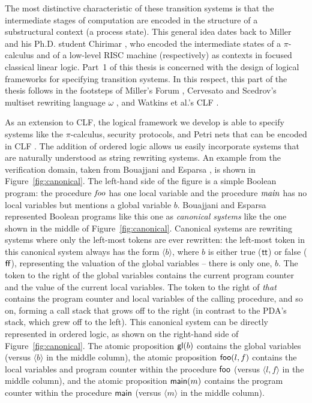 The most distinctive characteristic of these transition systems is
that the intermediate stages of computation are encoded in the
structure of a substructural context (a process state). This general
idea dates back to Miller \cite{miller92pi} and his Ph.D. student
Chirimar \cite{chirimar95proof}, who encoded the intermediate states
of a $\pi$-calculus and of a low-level RISC machine (respectively) as
contexts in focused classical linear logic.  Part~1 of this thesis is
concerned with the design of logical frameworks for specifying
transition systems.  In this respect, this part of the thesis follows
in the footsteps of Miller's Forum \cite{miller96forum}, Cervesato and
Scedrov's multiset rewriting language $\omega$
\cite{cervesato09relating}, and Watkins et al.'s CLF
\cite{watkins02concurrent}. 



As an extension to CLF, the logical framework we develop is able to
specify systems like the $\pi$-calculus, security protocols, and Petri
nets that can be encoded in CLF \cite{cervesato02concurrent}. The
addition of ordered logic allows us easily incorporate systems that
are naturally understood as string rewriting systems. An example from
the verification domain, taken from Bouajjani and Esparsa
\cite{bouajjani06rewriting}, is shown in Figure~\ref{fig:canonical}.
The left-hand side of the figure is a simple Boolean program: the
procedure ${\it foo}$ has one local variable and the procedure ${\it
  main}$ has no local variables but mentions a global variable $b$.
Bouajjani and Esparsa represented Boolean programs like this one as
{\it canonical systems} like the one shown in the middle of
Figure~\ref{fig:canonical}. Canonical systems are rewriting systems
where only the left-most tokens are ever rewritten: the left-most
token in this canonical system always has the form $\langle b \rangle$,
where $b$ is either true (${\sf tt}$) or false (${\sf ff}$),
representing the valuation of the global variables -- there is only 
one, $b$.  The token to the
right of the global variables contains the current program counter and
the value of the current local variables. The token to the right of
{\it that} contains the program counter and local variables of the calling
procedure, and so on, forming a call stack that grows off to the right
(in contrast to the PDA's stack, which grew off to the left). This
canonical system can be directly represented in ordered logic, as
shown on the right-hand side of Figure~\ref{fig:canonical}. The atomic
proposition ${\sf gl}(b)$ contains the global variables (versus
$\langle b \rangle$ in the middle column), the atomic proposition
${\sf foo}(l, f)$ contains the local variables and program counter
within the procedure ${\sf foo}$ (versus $\langle l, f \rangle$ in the
middle column), and the atomic proposition ${\sf main}(m)$ contains
the program counter within the procedure ${\sf main}$ (versus $\langle
m \rangle$ in the middle column).

